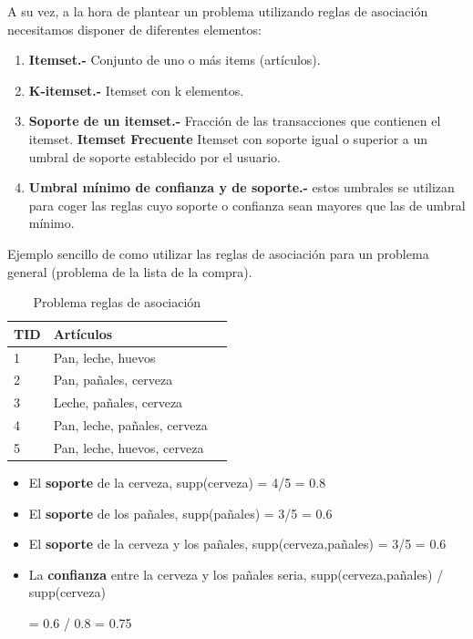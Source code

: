 \documentclass{cosas/tfg_domingo}
\begin{document}
A su vez, a la hora de plantear un problema utilizando reglas de asociación necesitamos disponer de diferentes elementos: 

\begin{enumerate}
    \item \textbf{Itemset.- }Conjunto de uno o más items (artículos).
    \item \textbf{K-itemset.- } Itemset con k elementos.
    \item \textbf{Soporte de un itemset.- } Fracción de las transacciones que contienen el itemset.
    \textbf{Itemset Frecuente} Itemset con soporte igual o superior a un umbral de soporte establecido por el usuario.
    \item \textbf{Umbral mínimo de confianza y de soporte.- } estos umbrales se utilizan para coger las reglas cuyo soporte o confianza sean mayores que las de umbral mínimo.
\end{enumerate}

Ejemplo sencillo de como utilizar las reglas de asociación para un problema general (problema de la lista de la compra). \citep{berzal2016reglas}

\begin{table}[h]
\centering
\begin{tabular}{|l|l|l|}
\hline
TID & Artículos                     \\ \hline
1         & Pan, leche, huevos            \\ \hline
2         & Pan, pañales, cerveza            \\ \hline
3         & Leche, pañales, cerveza            \\ \hline
4         & Pan, leche, pañales, cerveza         \\ \hline
5         & Pan, leche, huevos, cerveza         \\ \hline
\end{tabular}
\caption{Problema reglas de asociación}
\label{tab:my-table}
\end{table}

\begin{itemize}
    \item El \textbf{soporte} de la cerveza, supp(cerveza) = 4/5 = 0.8
    
    \item El \textbf{soporte} de los pañales, supp(pañales) = 3/5 = 0.6
    
    \item El \textbf{soporte} de la cerveza y los pañales, supp(cerveza,pañales) = 3/5 = 0.6
    
    \item La \textbf{confianza} entre la cerveza y los pañales seria, supp(cerveza,pañales) / supp(cerveza) 
   
    = 0.6 / 0.8 = 0.75
\end{itemize}
\end{document}

